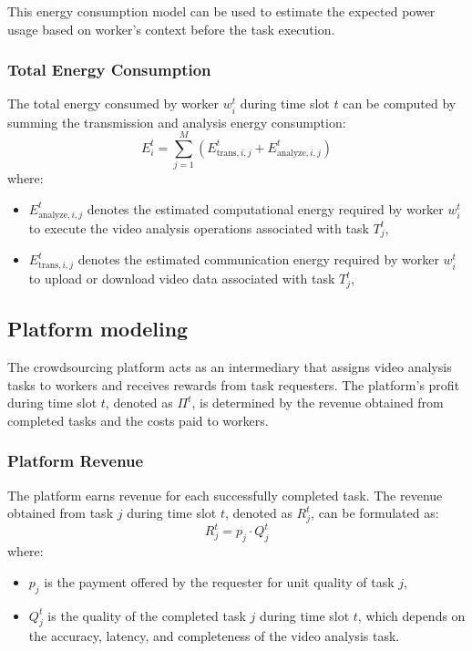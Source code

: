 This energy consumption model can be used to estimate the expected power usage based on worker's context before the task execution.


\subsubsection{Total Energy Consumption}
The total energy consumed by worker \( w_i^t \) during time slot \( t \) can be computed by summing the transmission and analysis energy consumption:
\[
E_{i}^t = \sum _{j=1} ^M (E_{\text{trans}, i,j}^t + E_{\text{analyze}, i,j}^t)
\]
where:
\begin{itemize}
    \item \( E_{\text{analyze}, i, j}^t \) denotes the estimated computational energy required by worker \( w_i^t \) to execute the video analysis operations associated with task \( T_j^t \),
    \item \( E_{\text{trans}, i, j}^t \) denotes the estimated communication energy required by worker \( w_i^t \) to upload or download video data associated with task \( T_j^t \),
\end{itemize}


\subsection{Platform modeling}
The crowdsourcing platform acts as an intermediary that assigns video analysis tasks to workers and receives rewards from task requesters. The platform's profit during time slot \( t \), denoted as \( \Pi^t \), is determined by the revenue obtained from completed tasks and the costs paid to workers.

\subsubsection{Platform Revenue}
The platform earns revenue for each successfully completed task. The revenue obtained from task \( j \) during time slot \( t \), denoted as \( R_j^t \), can be formulated as:
\[
R_j^t = p_j \cdot Q_j^t
\]
where:
\begin{itemize}
    \item \( p_j \) is the payment offered by the requester for unit quality of task \( j \),
    \item \( Q_j^t \) is the quality of the completed task \( j \) during time slot \( t \), which depends on the accuracy, latency, and completeness of the video analysis task.
\end{itemize}

